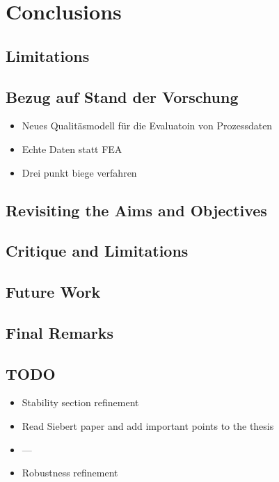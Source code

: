 \chapter{Conclusions}


\section{Limitations}

\begin{itemize}
\end{itemize}


\section{Bezug auf Stand der Vorschung}

\begin{itemize}
    \item Neues Qualitäsmodell für die Evaluatoin von Prozessdaten
    \item Echte Daten statt FEA
    \item Drei punkt biege verfahren
\end{itemize}


\section{Revisiting the Aims and Objectives}


\section{Critique and Limitations}


\section{Future Work}\label{sec:future-work}


\section{Final Remarks}


\section{TODO}

\begin{itemize}
    \item Stability section refinement
    \item Read Siebert paper and add important points to the thesis
    \item  ---
    \item Robustness refinement
\end{itemize}
